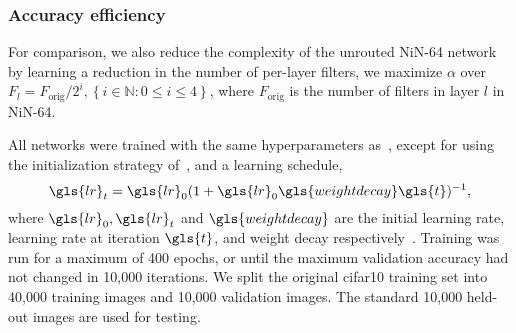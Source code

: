 \documentclass[thesis]{subfiles}
\begin{document}
	\subsubsection{Accuracy \vs efficiency}
	For comparison, we also reduce the complexity of the unrouted NiN-64 network by learning a reduction in the number of per-layer filters, \ie we maximize $\alpha$ over $F_l = F_\textrm{orig}/2^i, \left\{i\in \mathbb{N} : 0 \le i \le 4\right\}$, where $F_\textrm{orig}$ is the number of filters in layer $l$ in NiN-64. 
	
	All networks were trained with the same hyperparameters as~\citep{Lin2013NiN}, 
	except for using the initialization strategy of~\citep{He2015b}, and a learning schedule,
    \begin{equation}
        \gls{lr}_t = \gls{lr}_0(1+\gls{lr}_0\gls{weightdecay} \gls{t})^{-1},
    \end{equation}
    where $\gls{lr}_0,\gls{lr}_t$ and $\gls{weightdecay}$ are the initial learning rate, learning rate at iteration $\gls{t}$, and weight decay respectively~\citep{Bottou2012sgdtricks}. Training was run for a maximum of 400 epochs, or until the maximum validation accuracy had not changed in 10,000 iterations. 
	We split the original \gls{cifar10} training set into 40,000 training images and 
	10,000 validation images. 
	The standard 10,000 held-out images are used for testing.
	
\end{document}
